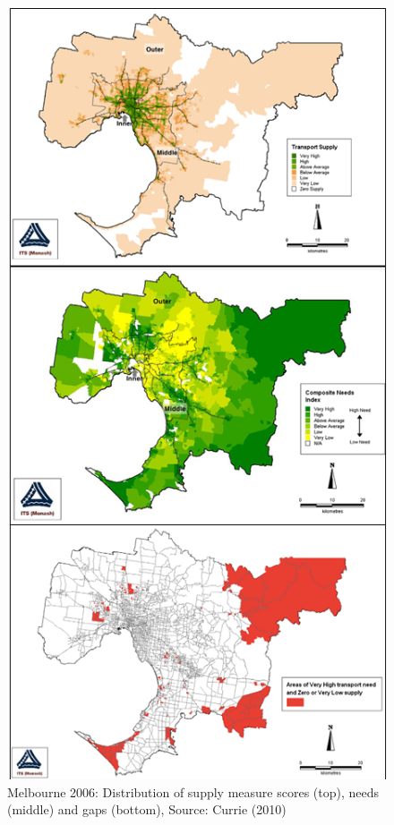 \documentclass[preprint, 3p,
authoryear]{elsarticle} %
\begin{document}
\begin{figure}
\includegraphics[width=6.31in]{graphics/Currie2010combined1} \caption{Melbourne 2006: Distribution of supply measure scores (top), needs (middle) and gaps (bottom), Source: Currie (2010)}\label{fig:Currie_map_SI}
\end{figure}
\end{document}
